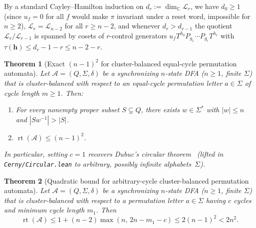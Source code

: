 \documentclass[11pt,a4paper]{article}
\newtheorem{theorem}{Theorem}[section]
\theoremstyle{definition}
\theoremstyle{remark}
\newcommand{\rt}{\operatorname{rt}}
\newcommand{\C}{\mathbb{C}}
\newcommand{\cA}{\mathcal{A}}
\newcommand{\cL}{\mathcal{L}}
\begin{document}
By a standard Cayley--Hamilton induction on $d_r := \dim_\C \cL_r$, we have $d_0 \ge 1$ (since $u_f = 0$ for all $f$ would make $\pi$ invariant under a reset word, impossible for $n \ge 2$), $\cL_r = \cL_{n-2}$ for all $r \ge n - 2$, and whenever $d_r > d_{r-1}$ the quotient $\cL_r/\cL_{r-1}$ is spanned by cosets of $r$-control generators $u_f T^{h_0} P_{g_1} \cdots P_{g_r} T^{h_r}$ with $\tau(\mathbf{h}) \le d_r - 1 - r \le n - 2 - r$.

\begin{theorem}[Exact $(n-1)^2$ for cluster-balanced equal-cycle permutation automata]
\label{thm:cb-equal}
Let $\cA = (Q, \Sigma, \delta)$ be a synchronizing $n$-state DFA ($n \ge 1$, finite $\Sigma$) that is cluster-balanced with respect to an equal-cycle permutation letter $a \in \Sigma$ of cycle length $m \ge 1$. Then:
\begin{enumerate}[label=(\arabic*),nosep]
  \item For every nonempty proper subset $S \subsetneq Q$, there exists $w \in \Sigma^*$ with $|w| \le n$ and $|S w^{-1}| > |S|$.
  \item $\rt(\cA) \le (n - 1)^2$.
\end{enumerate}
In particular, setting $c = 1$ recovers Dubuc's circular theorem~\cite{Dubuc1998} (lifted in \texttt{Cerny/Circular.lean} to arbitrary, possibly infinite alphabets~$\Sigma$).
\end{theorem}

\begin{theorem}[Quadratic bound for arbitrary-cycle cluster-balanced permutation automata]
\label{thm:cb-general}
Let $\cA = (Q, \Sigma, \delta)$ be a synchronizing $n$-state DFA ($n \ge 1$, finite $\Sigma$) that is cluster-balanced with respect to a permutation letter $a \in \Sigma$ having $c$ cycles and minimum cycle length $m_1$. Then
\[
  \rt(\cA) \le 1 + (n - 2)\max(n,\, 2n - m_1 - c) \le 2(n - 1)^2 < 2n^2.
\]
\end{theorem}
\end{document}
